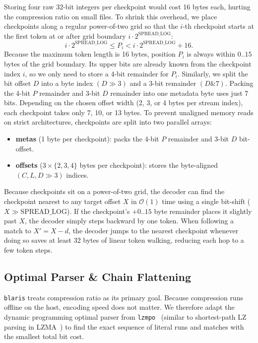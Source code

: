 \documentclass[10pt,twocolumn]{article}
\newcommand{\code}[1]{\texttt{#1}}
\begin{document}
Storing four raw 32-bit integers per checkpoint would cost 16 bytes each,
hurting the compression ratio on small files. To shrink this overhead, we place
checkpoints along a regular power-of-two grid so that the $i$-th checkpoint
starts at the first token at or after grid boundary $i \cdot
2^{\text{SPREAD\_LOG}}$:
\begin{equation}
    i \cdot 2^{\text{SPREAD\_LOG}} \le P_i < i \cdot 2^{\text{SPREAD\_LOG}} + 16.
\end{equation}
Because the maximum token length is 16 bytes, position $P_i$ is always within
$0..15$ bytes of the grid boundary. Its upper bits are already known from the
checkpoint index $i$, so we only need to store a 4-bit remainder for $P_i$.
Similarly, we split the bit offset $D$ into a byte index $(D \gg 3)$ and a 3-bit
remainder $(D \mathbin{\&} 7)$. Packing the 4-bit $P$ remainder and 3-bit $D$
remainder into one metadata byte uses just 7 bits. Depending on the chosen
offset width (2, 3, or 4 bytes per stream index), each checkpoint takes only 7,
10, or 13 bytes. To prevent unaligned memory reads on strict architectures,
checkpoints are split into two parallel arrays:
\begin{itemize}
    \item \textbf{metas} (1 byte per checkpoint): packs the 4-bit $P$ remainder
        and 3-bit $D$ bit-offset.
    \item \textbf{offsets} ($3 \times \{2,3,4\}$ bytes per checkpoint): stores
        the byte-aligned $(C, L, D \gg 3)$ indices.
\end{itemize}

Because checkpoints sit on a power-of-two grid, the decoder can find the
checkpoint nearest to any target offset $X$ in $\mathcal{O}(1)$ time using a
single bit-shift ($X \gg \text{SPREAD\_LOG}$). If the checkpoint's $+0..15$ byte
remainder places it slightly past $X$, the decoder simply steps backward by one
token. When following a match to $X' = X - d$, the decoder jumps to the nearest
checkpoint whenever doing so saves at least 32 bytes of linear token walking,
reducing each hop to a few token steps.

\subsection{Optimal Parser \& Chain Flattening}
\code{blaris} treats compression ratio as its primary goal. Because compression
runs offline on the host, encoding speed does not matter. We therefore adapt the
dynamic programming optimal parser from \code{lzmpo}~\cite{lzmpo} (similar to
shortest-path LZ parsing in LZMA~\cite{lzma}) to find the exact sequence of
literal runs and matches with the smallest total bit cost.
\end{document}

